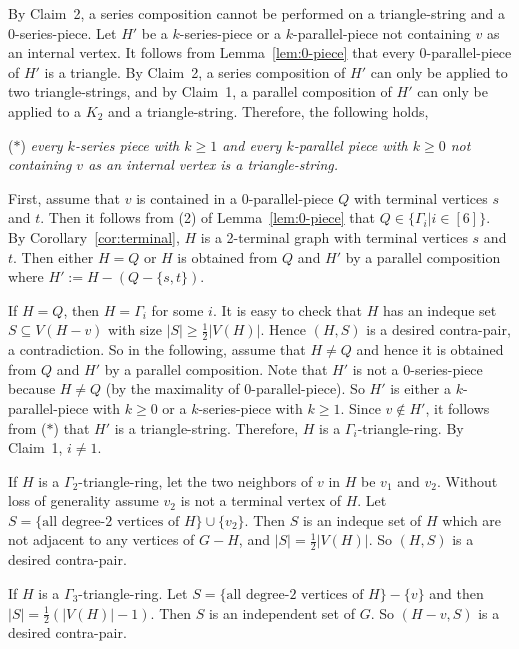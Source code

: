 \documentclass{article}
\begin{document}
By Claim~2, a series composition cannot be performed on a triangle-string and a $0$-series-piece.  Let $H'$ be a $k$-series-piece or a $k$-parallel-piece not containing $v$ as an internal vertex. It follows from Lemma~\ref{lem:0-piece} that every $0$-parallel-piece of $H'$ is a triangle. By Claim~2, a series composition of $H'$ can only be applied to two triangle-strings, and by Claim~1, a parallel composition of $H'$ can only be applied to a $K_2$ and a triangle-string. Therefore, the following holds, \medskip
\begin{description}
\item ($*$) {\sl every $k$-series piece with $k\ge 1$ and every $k$-parallel piece with $k\ge 0$ not containing $v$ as an internal vertex is a triangle-string. }
 \end{description}
\medskip


First, assume that $v$ is contained in a $0$-parallel-piece $Q$ with terminal vertices $s$ and $t$. Then it follows from (2) of Lemma~\ref{lem:0-piece} that  $Q\in \{\Gamma_i | i\in [6]\}$. %
By Corollary~\ref{cor:terminal}, $H$ is a 2-terminal graph with terminal vertices $s$ and $t$. Then either $H=Q$ or $H$ is obtained from $Q$ and $H'$ by a parallel composition where $H':=H-(Q-\{s,t\})$.

If $H=Q$, then $H=\Gamma_i$ for some $i$. It is easy to check that $H$ has an indeque set $S\subseteq V(H-v)$ with size $|S|\ge \frac 1 2 |V(H)|$. Hence $(H,S)$ is a desired contra-pair, a contradiction. So in the following, assume that $H\ne Q$ and hence it is obtained from $Q$ and $H'$ by a parallel composition. Note that $H'$ is not a $0$-series-piece because $H\ne Q$ (by the maximality of $0$-parallel-piece). So $H'$ is either a $k$-parallel-piece with $k\ge 0$ or a $k$-series-piece with $k\ge 1$. Since $v\notin H'$, it follows from ($*$) that $H'$ is a triangle-string. Therefore, $H$ is a $\Gamma_i$-triangle-ring. By Claim~1, $i\ne 1$. 


If $H$ is a $\Gamma_2$-triangle-ring, let the two neighbors of $v$ in $H$ be $v_1$ and $v_2$. Without loss of generality  assume $v_2$ is not a terminal vertex of $H$. Let $S=\{\mbox{all degree-2 vertices of } H\}\cup \{v_2\}$. Then $S$ is an indeque set of $H$ which are not adjacent to any vertices of $G-H$, and $|S|= \frac 1 2 |V(H)|$. So $(H,S)$ is a desired contra-pair. 

If $H$ is a $\Gamma_3$-triangle-ring. Let $S=\{\mbox{all degree-2 vertices of }H\}-\{v\}$ and then $ |S|= \frac 1 2 (|V(H)|-1)$.  Then $S$ is an independent set of $G$. So $(H-v, S)$ is a desired contra-pair. 
\end{document}
